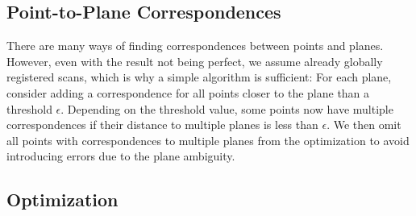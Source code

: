 \subsection{Point-to-Plane Correspondences}

There are many ways of finding correspondences between points and planes.
However, even with the result not being perfect, we assume already globally registered scans, which is why a simple algorithm is sufficient:
For each plane, consider adding a correspondence for all points closer to the plane than a threshold $\epsilon$.
Depending on the threshold value, some points now have multiple correspondences if their distance to multiple planes is less than $\epsilon$. We then omit all points with correspondences to multiple planes from the optimization to avoid introducing errors due to the plane ambiguity.

\subsection{Optimization}

